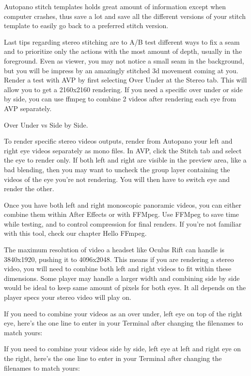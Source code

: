 \begin{fullwidth}
Autopano stitch templates holds great amount of information except when computer crashes, thus save a lot and save all the different versions of your stitch template to easily go back to a preferred stitch version. 
\clearpage


Last tips regarding stereo stitching are to A/B test different ways to fix a seam and to prioritize only the actions with the most amount of depth, usually in the foreground. Even as viewer, you may not notice a small seam in the background, but you will be impress by an amazingly stitched 3d movement coming at you. Render a test with AVP by first selecting Over Under at the Stereo tab. This will allow you to get a 2160x2160 rendering. If you need a specific over under or side by side, you can use ffmpeg to combine 2 videos after rendering each eye from AVP separately.

\clearpage
{\large Over Under vs Side by Side. \par}

To render specific stereo videos outputs, render from Autopano your left and right eye videos separately as mono files. In AVP, click the Stitch tab and select the eye to render only. If both left and right are visible in the preview area, like a bad blending, then you may want to uncheck the group layer containing the videos of the eye you’re not rendering. You will then have to switch eye and render the other.

Once you have both left and right monoscopic panoramic videos, you can either combine them within After Effects or with FFMpeg. Use FFMpeg to save time while testing, and to control compression for final renders. If you’re not familiar with this tool, check our chapter Hello FFmpeg. 

The maximum resolution of video a headset like Oculus Rift can handle is 3840x1920, pushing it to 4096x2048. This means if you are rendering a stereo video, you will need to combine both left and right videos to fit within these dimensions. Some player may handle a larger width and combining side by side would be ideal to keep same amount of pixels for both eyes. It all depends on the player specs your stereo video will play on. 

If you need to combine your videos as an over under, left eye on top of the right eye, here’s the one line to enter in your Terminal after changing the filenames to match yours:


If you need to combine your videos side by side, left eye at left and right eye on the right, here’s the one line to enter in your Terminal after changing the filenames to match yours:




\clearpage
\end{fullwidth}
